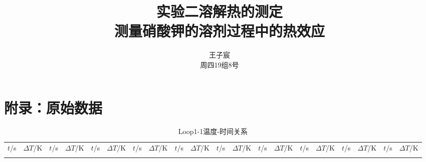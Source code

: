 \documentclass[cn,hazy,pku,12pt,normal,math=newtx,cite=super]{elegantnote}
\title{实验二\quad 溶解热的测定\\
\Large{测量硝酸钾的溶剂过程中的热效应}}
\author{王子宸\quad 210001873\\
周四19组\quad 8号}
\institute{化学与分子工程学院}
\begin{document}
\section*{\quad 附录：原始数据}

{\tiny

\begin{longtable}{cc|cc|cc|cc|cc|cc|cc|cc|cc|cc}
\toprule
\endhead

\caption{Loop1-1温度-时间关系}\\
\toprule
$t$/\si{s} & $\Delta T$/\si{K} & $t$/\si{s} & $\Delta T$/\si{K} & $t$/\si{s} & $\Delta T$/\si{K} & $t$/\si{s} & $\Delta T$/\si{K} & $t$/\si{s} & $\Delta T$/\si{K} & $t$/\si{s} & $\Delta T$/\si{K} & $t$/\si{s} & $\Delta T$/\si{K} & $t$/\si{s} & $\Delta T$/\si{K} & $t$/\si{s} & $\Delta T$/\si{K} & $t$/\si{s} & $\Delta T$/\si{K} \\
\midrule
\endfirsthead

\bottomrule
\endfoot

\bottomrule
\endlastfoot


\end{longtable}}
\end{document}
